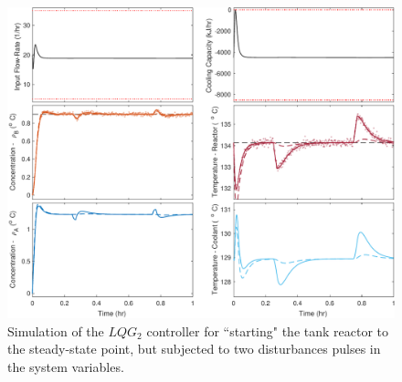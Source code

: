 \documentclass[a4paper,11pt]{book}
\numberwithin{figure}{chapter}
\numberwithin{equation}{chapter}
\numberwithin{table}{chapter}
\theoremstyle{definition}
\begin{document}
\begin{figure}[ht] \centering
	\includegraphics[width=\textwidth]{chapter7/lqg02}
	\caption{Simulation of the $LQG_2$ controller for ``starting" the tank reactor to the steady-state point, but subjected to two disturbances pulses in the system variables.}
	\label{fig:lqg02Sim}
\end{figure}	
\end{document}
